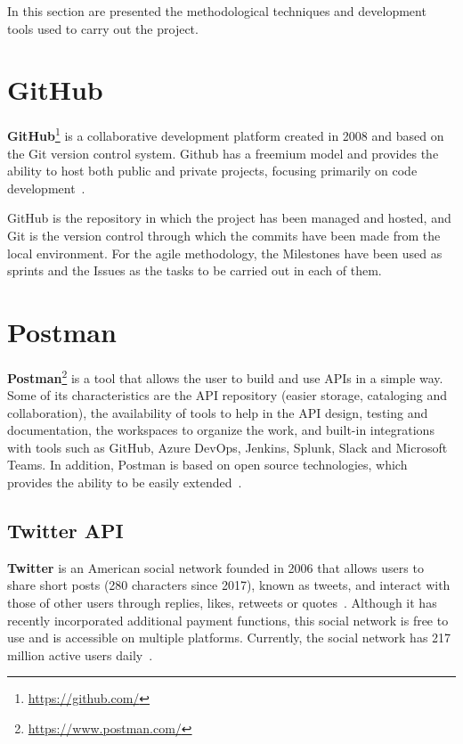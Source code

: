 
\nonzeroparskip In this section are presented the methodological techniques and development tools used to carry out the project.

\section{GitHub}

\nonzeroparskip \textbf{GitHub}\footnote{\url{https://github.com/}} is a collaborative development platform created in 2008 and based on the Git version control system. Github has a freemium model and provides the ability to host both public and private projects, focusing primarily on code development~\cite{wikipedia_github}.

\nonzeroparskip GitHub is the repository in which the project has been managed and hosted, and Git is the version control through which the commits have been made from the local environment. For the agile methodology, the Milestones have been used as sprints and the Issues as the tasks to be carried out in each of them.

\section{Postman}

\nonzeroparskip \textbf{Postman}\footnote{\url{https://www.postman.com/}} is a tool that allows the user to build and use APIs in a simple way. Some of its characteristics are the API repository (easier storage, cataloging and collaboration), the availability of tools to help in the API design, testing and documentation, the workspaces to organize the work, and built-in integrations with tools such as GitHub, Azure DevOps, Jenkins, Splunk, Slack and Microsoft Teams. In addition, Postman is based on open source technologies, which provides the ability to be easily extended~\cite{postman}.

\subsection{Twitter API}
\nonzeroparskip \textbf{Twitter} is an American social network founded in 2006 that allows users to share short posts (280 characters since 2017), known as tweets, and interact with those of other users through replies, likes, retweets or quotes~\cite{wikipedia_twitter}. Although it has recently incorporated additional payment functions, this social network is free to use and is accessible on multiple platforms. Currently, the social network has 217 million active users daily~\cite{variety_twitterusers}.

